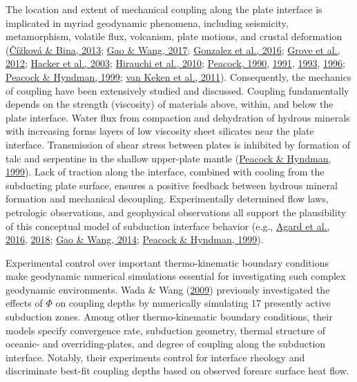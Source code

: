 The location and extent of mechanical coupling along the plate interface is implicated in myriad geodynamic phenomena, including seismicity, metamorphism, volatile flux, volcanism, plate motions, and crustal deformation (\protect\hyperlink{ref-cizkova2013}{Čížková \& Bina, 2013}; \protect\hyperlink{ref-gao2017}{Gao \& Wang, 2017}; \protect\hyperlink{ref-gonzalez2016}{Gonzalez et al., 2016}; \protect\hyperlink{ref-grove2012}{Grove et al., 2012}; \protect\hyperlink{ref-hacker2003}{Hacker et al., 2003}; \protect\hyperlink{ref-hirauchi2010}{Hirauchi et al., 2010}; \protect\hyperlink{ref-peacock1990}{Peacock, 1990}, \protect\hyperlink{ref-peacock1991}{1991}, \protect\hyperlink{ref-peacock1993}{1993}, \protect\hyperlink{ref-peacock1996}{1996}; \protect\hyperlink{ref-peacock1999a}{Peacock \& Hyndman, 1999}; \protect\hyperlink{ref-vankeken2011}{van Keken et al., 2011}). Consequently, the mechanics of coupling have been extensively studied and discussed. Coupling fundamentally depends on the strength (viscosity) of materials above, within, and below the plate interface. Water flux from compaction and dehydration of hydrous minerals with increasing  forms layers of low viscosity sheet silicates near the plate interface. Transmission of shear stress between plates is inhibited by formation of talc and serpentine in the shallow upper-plate mantle (\protect\hyperlink{ref-peacock1999a}{Peacock \& Hyndman, 1999}). Lack of traction along the interface, combined with cooling from the subducting plate surface, ensures a positive feedback between hydrous mineral formation and mechanical decoupling. Experimentally determined flow laws, petrologic observations, and geophysical observations all support the plausibility of this conceptual model of subduction interface behavior (e.g., \protect\hyperlink{ref-agard2016}{Agard et al., 2016}, \protect\hyperlink{ref-agard2018}{2018}; \protect\hyperlink{ref-gao2014}{Gao \& Wang, 2014}; \protect\hyperlink{ref-peacock1999a}{Peacock \& Hyndman, 1999}).

Experimental control over important thermo-kinematic boundary conditions make geodynamic numerical simulations essential for investigating such complex geodynamic environments. Wada \& Wang (\protect\hyperlink{ref-wada2009}{2009}) previously investigated the effects of \(\Phi\) on coupling depths by numerically simulating 17 presently active subduction zones. Among other thermo-kinematic boundary conditions, their models specify convergence rate, subduction geometry, thermal structure of oceanic- and overriding-plates, and degree of coupling along the subduction interface. Notably, their experiments control for interface rheology and discriminate best-fit coupling depths based on observed forearc surface heat flow.

